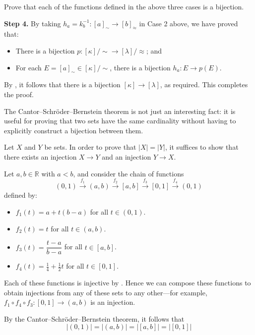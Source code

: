 \begin{cproof}
\begin{exercise}
Prove that each of the functions defined in the above three cases is a bijection.
\end{exercise}

\textbf{Step 4.} By taking $h_a = k_b^{-1} : [a]_{\sim} \to [b]_{\approx}$ in Case 2 above, we have proved that:
\begin{itemize}
\item There is a bijection $p : [\kappa]/{\sim} \to [\lambda]/{\approx}$; and
\item For each $E = [a]_{\sim} \in [\kappa]/{\sim}$, there is a bijection $h_a : E \to p(E)$.
\end{itemize}
By , it follows that there is a bijection $[\kappa] \to [\lambda]$, as required. This completes the proof.
\end{cproof}

The Cantor--Schr\"{o}der--Bernstein theorem is not just an interesting fact: it is useful for proving that two sets have the same cardinality without having to explicitly construct a bijection between them.

\begin{strategy}
\label{strCantorSchroederBernstein}
Let $X$ and $Y$ be sets. In order to prove that $|X| = |Y|$, it suffices to show that there exists an injection $X \to Y$ and an injection $Y \to X$.
\end{strategy}

\begin{example}
Let $a,b \in \mathbb{R}$ with $a<b$, and consider the chain of functions
\[ (0,1) \xrightarrow{f_1} (a,b) \xrightarrow{f_2} [a,b] \xrightarrow{f_3} [0,1] \xrightarrow{f_4} (0,1) \]
defined by:

\begin{itemize}
\item $f_1(t) = a + t(b-a)$ for all $t \in (0,1)$.
\item $f_2(t) = t$ for all $t \in (a,b)$.
\item $f_3(t) = \dfrac{t-a}{b-a}$ for all $t \in [a,b]$.
\item $f_4(t) = \frac{1}{4} + \frac{1}{2}t$ for all $t \in [0,1]$.
\end{itemize}

Each of these functions is injective by . Hence we can compose these functions to obtain injections from any of these sets to any other---for example, $f_1 \circ f_4 \circ f_3 : [0,1] \to (a,b)$ is an injection.

By the Cantor--Schr\"{o}der--Bernstein theorem, it follows that
\[ |(0,1)| = |(a,b)| = |[a,b]| = |[0,1]| \]
\end{example}

